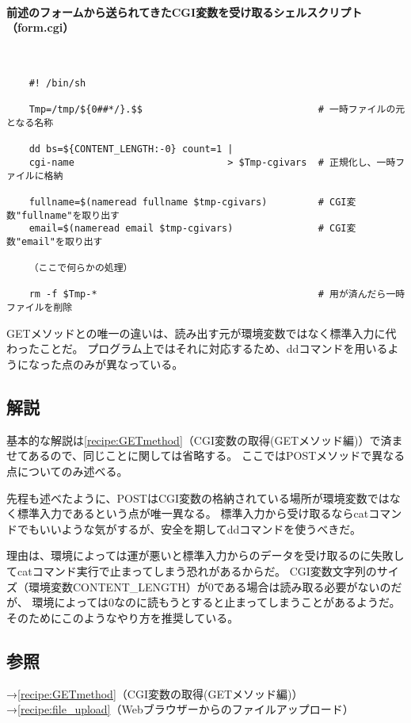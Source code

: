 \paragraph{前述のフォームから送られてきたCGI変数を受け取るシェルスクリプト（form.cgi）} 　\\
\begin{frameboxit}{160.0mm}
\begin{verbatim}
	#! /bin/sh
	
	Tmp=/tmp/${0##*/}.$$                               # 一時ファイルの元となる名称
	
	dd bs=${CONTENT_LENGTH:-0} count=1 |
	cgi-name                           > $Tmp-cgivars  # 正規化し、一時ファイルに格納
	
	fullname=$(nameread fullname $tmp-cgivars)         # CGI変数"fullname"を取り出す
	email=$(nameread email $tmp-cgivars)               # CGI変数"email"を取り出す
	
	（ここで何らかの処理）
	
	rm -f $Tmp-*                                       # 用が済んだら一時ファイルを削除
\end{verbatim}
\end{frameboxit}

GETメソッドとの唯一の違いは、読み出す元が環境変数ではなく標準入力に代わったことだ。
プログラム上ではそれに対応するため、ddコマンドを用いるようになった点のみが異なっている。

\subsection*{解説}

基本的な解説は\ref{recipe:GETmethod}（CGI変数の取得(GETメソッド編)）で済ませてあるので、同じことに関しては省略する。
ここではPOSTメソッドで異なる点についてのみ述べる。

先程も述べたように、POSTはCGI変数の格納されている場所が環境変数ではなく標準入力であるという点が唯一異なる。
標準入力から受け取るならcatコマンドでもいいような気がするが、安全を期してddコマンドを使うべきだ。

理由は、環境によっては運が悪いと標準入力からのデータを受け取るのに失敗してcatコマンド実行で止まってしまう恐れがあるからだ。
CGI変数文字列のサイズ（環境変数CONTENT\_{}LENGTH）が0である場合は読み取る必要がないのだが、
環境によっては0なのに読もうとすると止まってしまうことがあるようだ。そのためにこのようなやり方を推奨している。

\subsection*{参照}

\noindent
→\ref{recipe:GETmethod}（CGI変数の取得(GETメソッド編)）\\
→\ref{recipe:file_upload}（Webブラウザーからのファイルアップロード）
